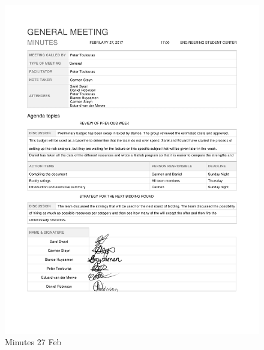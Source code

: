 \begin{appendices}
\begin{figure}[H]
\centering
\includegraphics[scale=0.25]{Meeting_minutes_27_Feb.png}
\caption{Minutes 27 Feb}
\end{figure}


\end{appendices}
